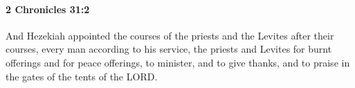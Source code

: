 
		\paragraph{2 Chronicles 31:2} %
			\label{2CHRONICLES-31-2}

			And Hezekiah appointed the courses of the priests and the Levites after their courses, every man according to his service, the priests and Levites for burnt offerings and for peace offerings, to minister, and to give thanks, and to praise in the gates of the tents of the LORD.


